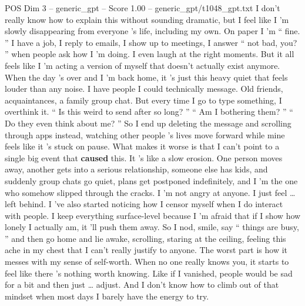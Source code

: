 \begin{textsample}{POS Dim 3 – generic\_gpt – Score 1.00 – generic\_gpt/t1048\_gpt.txt}  \label{ex:f3_pos_033}
I don't really know how to explain this without sounding dramatic, but I feel like I ’m slowly disappearing from everyone ’s life, including my own.
On paper I ’m “ fine. ” I have a job, I reply to emails, I show up to meetings, I answer “ not bad, you? ” when people ask how I ’m doing.
I even laugh at the right moments.
But it all feels like I ’m acting a version of myself that doesn't actually exist anymore.
When the day ’s over and I ’m back home, it ’s just this heavy quiet that feels louder than any noise.
I have people I could technically message.
Old friends, acquaintances, a family group chat.
But every time I go to type something, I overthink it. “ Is this weird to send after so long? ” “ Am I bothering them? ” “ Do they even think about me? ” So I end up deleting the message and scrolling through apps instead, watching other people ’s lives move forward while mine feels like it ’s stuck on pause.
What makes it worse is that I can't point to a single big event that \textbf{caused} this.
It ’s like a slow erosion.
One person moves away, another gets into a serious relationship, someone else has kids, and suddenly group chats go quiet, plans get postponed indefinitely, and I ’m the one who somehow slipped through the cracks.
I ’m not angry at anyone.
I just feel … left behind.
I ’ve also started noticing how I censor myself when I do interact with people.
I keep everything surface-level because I ’m afraid that if I show how lonely I actually am, it ’ll push them away.
So I nod, smile, say “ things are busy, ” and then go home and lie awake, scrolling, staring at the ceiling, feeling this ache in my chest that I can't really justify to anyone.
The worst part is how it messes with my sense of self-worth.
When no one really knows you, it starts to feel like there ’s nothing worth knowing.
Like if I vanished, people would be sad for a bit and then just … adjust.
And I don't know how to climb out of that mindset when most days I barely have the energy to try.

\end{textsample}
